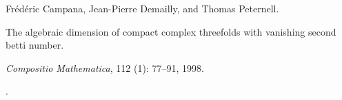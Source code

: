 Fr{\'e}d{\'e}ric Campana, Jean-Pierre Demailly, and Thomas Peternell.

\newblock The algebraic dimension of compact complex threefolds with vanishing
  second betti number.

\newblock \emph{Compositio Mathematica}, 112 (1): 77--91,
  1998.

\newblock {}.

